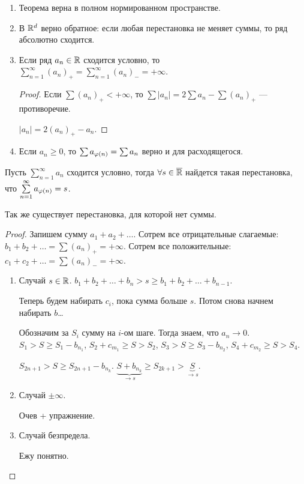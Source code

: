 \begin{remark}
    \begin{enumerate}
        \item Теорема верна в полном нормированном пространстве.
        \item В $\mathbb{R}^d$ верно обратное: если любая перестановка не меняет суммы, то ряд абсолютно сходится.
        \item Если ряд $a_n \in \mathbb{R}$ сходится условно, то  $\sum\limits_{n=1}^\infty (a_n)_+ = \sum\limits_{n=1}^\infty (a_n)_- = +\infty$.
             \begin{proof}
                Если $\sum (a_n)_+ < +\infty$, то  $\sum |a_n| = 2 \sum a_n - \sum (a_n)_+$ --- противоречие.

                 $|a_n| = 2(a_n)_+ - a_n$.
            \end{proof}
        \item Если $a_n \ge 0$, то $\sum a_{\varphi(n)} = \sum a_n$ верно и для расходящегося.
    \end{enumerate}
\end{remark}
\begin{theorem}
    Пусть $\sum\limits_{n=1}^\infty a_n$ сходится условно, тогда  $\forall s \in \overline{\mathbb{R}}$ найдется такая перестановка, что  $\sum\limits_{n=1}^\infty a_{\varphi(n)} = s$.

    Так же существует перестановка, для которой нет суммы.
\end{theorem}
\begin{proof}
    Запишем сумму $a_1 + a_2 + \ldots$. Сотрем все отрицательные слагаемые: $b_1 + b_2 + \ldots = \sum (a_n)_+ = +\infty$. Сотрем все положительные: $c_1 + c_2 + \ldots = \sum (a_n)_- = +\infty$.
     \begin{enumerate}
         \item Случай $s \in \mathbb{R}$.  $b_1 + b_2 + \ldots + b_n > s \ge b_1 + b_2  + \ldots + b_{n-1}$.

             Теперь будем набирать $c_i$, пока сумма больше  $s$. Потом снова начнем набирать  $b$\ldots

             Обозначим за $S_i$ сумму на  $i$-ом шаге. Тогда знаем, что  $a_n \to 0$.  $S_1 > S \ge S_1 - b_{n_1}$, $S_2 + c_{m_1} \ge S > S_2$, $S_3 > S \ge S_3 - b_{n_2}$, $S_4 + c_{m_2} \ge S > S_4$.

             $S_{2n+1} > S \ge S_{2n+1} - b_{n_k}$. $\underbrace{S + b_{n_k}}_{\to s} \ge S_{2k+1} > \underbrace{S}_{\to s}$. 
         \item Случай $\pm \infty$.

             Очев + упражнение.
         \item Случай безпредела. 

             Ежу понятно.
    \end{enumerate}
\end{proof}
